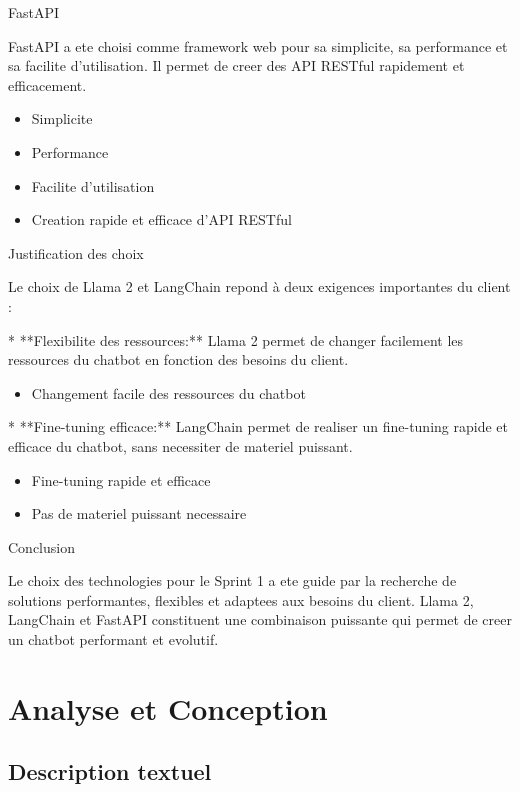 \documentclass[a4paper, 11pt, openany]{report}
\begin{document}
FastAPI

FastAPI a ete choisi comme framework web pour sa simplicite, sa performance et sa facilite d'utilisation. Il permet de creer des API RESTful rapidement et efficacement.

\begin{itemize}
\item Simplicite
\item Performance
\item Facilite d'utilisation
\item Creation rapide et efficace d'API RESTful
\end{itemize}

 Justification des choix

Le choix de Llama 2 et LangChain repond à deux exigences importantes du client :

* **Flexibilite des ressources:** Llama 2 permet de changer facilement les ressources du chatbot en fonction des besoins du client.

\begin{itemize}
\item Changement facile des ressources du chatbot
\end{itemize}

* **Fine-tuning efficace:** LangChain permet de realiser un fine-tuning rapide et efficace du chatbot, sans necessiter de materiel puissant.

\begin{itemize}
\item Fine-tuning rapide et efficace
\item Pas de materiel puissant necessaire
\end{itemize}

 Conclusion

Le choix des technologies pour le Sprint 1 a ete guide par la recherche de solutions performantes, flexibles et adaptees aux besoins du client. Llama 2, LangChain et FastAPI constituent une combinaison puissante qui permet de creer un chatbot performant et evolutif.


\section{Analyse et Conception}
\subsection{Description textuel}
\end{document}
